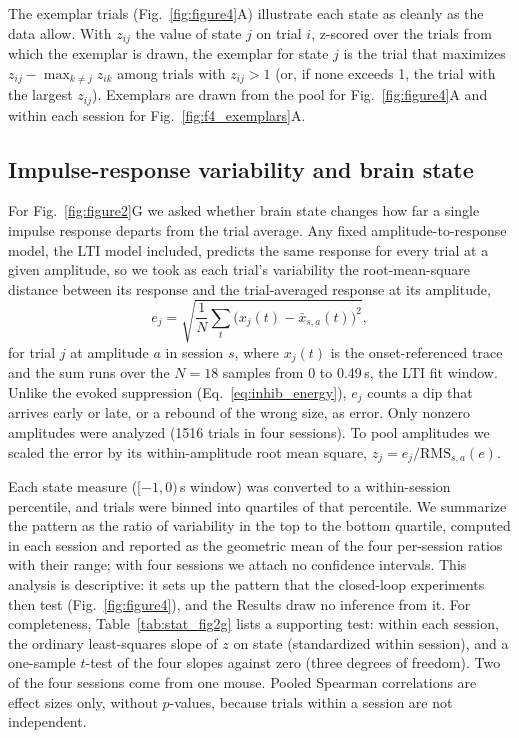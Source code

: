 The exemplar trials (Fig.~\ref{fig:figure4}A) illustrate each state as cleanly as
the data allow. With $z_{ij}$ the value of state $j$ on trial $i$, z-scored over
the trials from which the exemplar is drawn, the exemplar for state $j$ is the
trial that maximizes $z_{ij} - \max_{k \neq j} z_{ik}$ among trials with
$z_{ij} > 1$ (or, if none exceeds 1, the trial with the largest $z_{ij}$).
Exemplars are drawn from the pool for Fig.~\ref{fig:figure4}A and within each
session for Fig.~\ref{fig:f4_exemplars}A.

\subsection*{Impulse-response variability and brain state}
\label{sec:imp_state}

For Fig.~\ref{fig:figure2}G we asked whether brain state changes how far a
single impulse response departs from the trial average. Any fixed
amplitude-to-response model, the LTI model included, predicts the same response
for every trial at a given amplitude, so we took as each trial's variability the
root-mean-square distance between its response and the trial-averaged response
at its amplitude,
%
\begin{equation}
e_{j} = \sqrt{\frac{1}{N}\sum_{t} \bigl(x_{j}(t) - \bar{x}_{s,a}(t)\bigr)^{2}},
\label{eq:l2_error}
\end{equation}
%
for trial $j$ at amplitude $a$ in session $s$, where $x_{j}(t)$ is the
onset-referenced trace and the sum runs over the $N = 18$ samples from 0 to
0.49\,s, the LTI fit window. Unlike the evoked suppression
(Eq.~\ref{eq:inhib_energy}), $e_{j}$ counts a dip that arrives early or late, or
a rebound of the wrong size, as error. Only nonzero amplitudes were analyzed
(1516 trials in four sessions). To pool amplitudes we scaled the error by its
within-amplitude root mean square, $z_{j} = e_{j} / \mathrm{RMS}_{s,a}(e)$.

Each state measure ($[-1, 0)$\,s window) was converted to a within-session
percentile, and trials were binned into quartiles of that percentile. We
summarize the pattern as the ratio of variability in the top to the bottom
quartile, computed in each session and reported as the geometric mean of the
four per-session ratios with their range; with four sessions we attach no
confidence intervals. This analysis is descriptive: it sets up the pattern that
the closed-loop experiments then test (Fig.~\ref{fig:figure4}), and the Results
draw no inference from it. For completeness, Table~\ref{tab:stat_fig2g} lists a
supporting test: within each session, the ordinary least-squares slope of $z$ on
state (standardized within session), and a one-sample $t$-test of the four
slopes against zero (three degrees of freedom). Two of the four sessions come
from one mouse. Pooled Spearman correlations are effect sizes only, without
$p$-values, because trials within a session are not independent.

